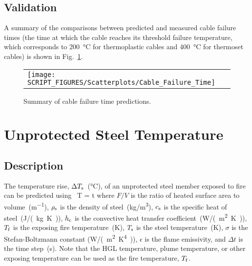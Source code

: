 \clearpage


\subsection*{Validation}

A summary of the comparisons between predicted and measured cable failure times (the time at which the cable reaches its threshold failure temperature, which corresponds to \SI{200}{\celsius} for thermoplastic cables and \SI{400}{\celsius} for thermoset cables) is shown in Fig.~\ref{Surface_Temperature_THIEF_Summary}.

\begin{figure}[!ht]
\begin{center}
\begin{tabular}{l}
\texttt{[image: SCRIPT\_FIGURES/Scatterplots/Cable\_Failure\_Time]}
\end{tabular}
\end{center}
\caption[Summary of cable failure time predictions]
{Summary of cable failure time predictions.}
\label{Surface_Temperature_THIEF_Summary}
\end{figure}

\clearpage


\section{Unprotected Steel Temperature}
\label{sec:Unprotected_Steel_Temperature}

\subsection*{Description}

The temperature rise, $\Delta T\sb{s}$~(\si{\celsius}), of an unprotected steel member exposed to fire can be predicted using~\cite{SFPE:Milke2}
\be
\Delta T =    \Delta t
\label{eq:unprotected_steel}
\ee
where $F/V$ is the ratio of heated surface area to volume~(\si{m^{-1}}), $\rho\sb{s}$ is the density of steel~(\si{kg/m^3}), $c\sb{s}$ is the specific heat of steel~(\si{J/(kg.K)}), $h\sb{c}$ is the convective heat transfer coefficient~(\si{W/(m^2.K)}), $T\sb{f}$ is the exposing fire temperature~(\si{K}), $T\sb{s}$ is the steel temperature~(\si{K}), $\sigma$ is the Stefan-Boltzmann constant (\si{W/(m^2.K^4)}), $\epsilon$ is the flame emissivity, and $\Delta t$ is the time step~(\si{s}). Note that the HGL temperature, plume temperature, or other exposing temperature can be used as the fire temperature, $T\sb{f}$.


